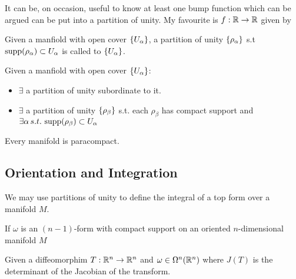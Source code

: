 \documentclass{article}
\begin{document}
\begin{remark}
	It can be, on occasion, useful to know at least one bump function which can be argued can be put into a partition of unity. My favourite is $f: \mathbb{R} \to \mathbb{R}$ given by  
\end{remark}

\begin{definition}
	Given a manfiold with open cover $\left\{ U_\alpha \right\}$, a partition of unity $\left\{ \rho_\alpha \right\}$ s.t $\operatorname{supp}(\rho_\alpha) \subset U_\alpha$ is called  to $\left\{ U_\alpha \right\}$. 
\end{definition}

\begin{prop}
	Given a manfiold with open cover $\left\{ U_\alpha \right\}$:
	\begin{itemize}
		\item $\exists$ a partition of unity subordinate to it.
		\item $\exists$ a partition of unity $\left\{ \rho_\beta \right\}$ s.t. each $\rho_\beta$ has compact support and $\exists \alpha \, s.t. \, \operatorname{supp}(\rho_\beta) \subset U_\alpha$ 
	\end{itemize}
\end{prop}

\begin{prop}
	Every manifold is paracompact.
\end{prop}

\subsection{Orientation and Integration}

We may use partitions of unity to define the integral of a top form over a manifold $M$. 

\begin{theorem}
	If $\omega$ is an $(n-1)$-form with compact support on an oriented $n$-dimensional manifold $M$
\end{theorem}

\begin{prop}
	Given a diffeomorphim $T: \mathbb{R}^n \to \mathbb{R}^n$ and $\omega\in \Omega^n(\mathbb{R}^n)$ 
	where $J(T)$ is the determinant of the Jacobian of the transform. 
\end{prop}
\end{document}
